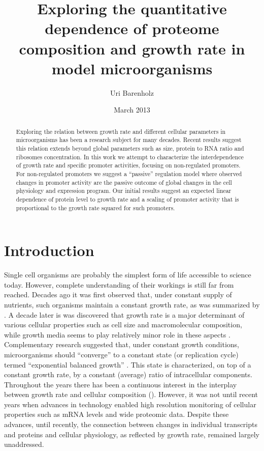 \documentclass[a4page,notitlepage]{article}
\title{Exploring the quantitative dependence of proteome composition and growth rate in model microorganisms}
\author{Uri Barenholz}
\date{March 2013}
\begin{document}
\maketitle
\begin{abstract}
Exploring the relation between growth rate and different cellular parameters in microorganisms has been a research subject for many decades.
Recent results suggest this relation extends beyond global parameters such as size, protein to RNA ratio and ribosomes concentration.
In this work we attempt to characterize the interdependence of growth rate and specific promoter activities, focusing on non-regulated promoters.
For non-regulated promoters we suggest a ``passive'' regulation model where observed changes in promoter activity are the passive outcome of global changes in the cell physiology and expression program.
Our initial results suggest an expected linear dependence of protein level to growth rate and a scaling of promoter activity that is proportional to the growth rate squared for such promoters.
\end{abstract}
\clearpage
\tableofcontents

\section{Introduction}
Single cell organisms are probably the simplest form of life accessible to science today.
However, complete understanding of their workings is still far from reached.
Decades ago it was first observed that, under constant supply of nutrients, such organisms maintain a constant growth rate, as was summarized by \cite{Monod1949}.
A decade later is was discovered that growth rate is a major determinant of various cellular properties such as cell size and macromolecular composition, while growth media seems to play relatively minor role in these aspects \cite{Schaechter1958}.
Complementary research suggested that, under constant growth conditions, microorganisms should ``converge'' to a constant state (or replication cycle) termed ``exponential balanced growth'' \cite{Campbell1957}.
This state is characterized, on top of a constant growth rate, by a constant (average) ratio of intracellular components.
Throughout the years there has been a continuous interest in the interplay between growth rate and cellular composition (\cite{Maaloe1969,Pedersen1978a,Bremer1987}).
However, it was not until recent years when advances in technology enabled high resolution monitoring of cellular properties such as mRNA levels and wide proteomic data.
Despite these advances, until recently, the connection between changes in individual transcripts and proteins and cellular physiology, as reflected by growth rate, remained largely unaddressed.
\end{document}
